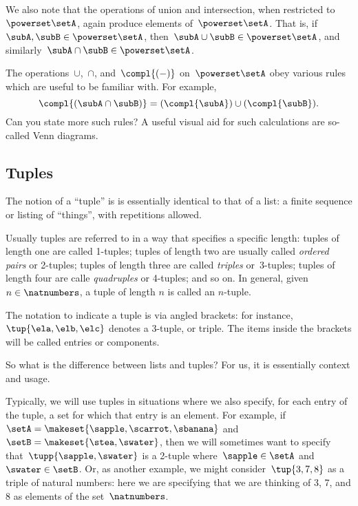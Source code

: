 We also note that the operations of union and intersection, when restricted to~$\powerset \setA$, again produce elements of~$\powerset \setA$.
That is, if~$\subA, \subB \in \powerset \setA$, then~$\subA \cup \subB \in \powerset \setA$, and similarly~$\subA \cap \subB \in \powerset \setA$.

The operations~$\cup$,~$\cap$, and~$\compl{( - )}$ on~$\powerset \setA$ obey various rules which are useful to be familiar with.
For example,
\begin{equation*}
    \compl{(\subA \cap \subB)} = (\compl{\subA}) \cup (\compl{\subB}).
\end{equation*}
Can you state more such rules?
A useful visual aid for such calculations are so-called Venn diagrams.


\subsection{Tuples}

The notion of a ``tuple'' is is essentially identical to that of a list: a finite sequence or listing of ``things'', with repetitions allowed.

Usually tuples are referred to in a way that specifies a specific length: tuples of length one are called 1-tuples; tuples of length two are usually called \emph{ordered pairs} or 2-tuples; tuples of length three are called \emph{triples} or~3-tuples; tuples of length four are calle \emph{quadruples} or 4-tuples; and so on.
In general, given~$n \in \natnumbers$, a tuple of length $n$ is called an $n$-tuple.

The notation to indicate a tuple is via angled brackets: for instance,~$\tup{\ela, \elb, \elc}$ denotes a 3-tuple, or triple.
The items inside the brackets will be called entries or components.

So what is the difference between lists and tuples?
For us, it is essentially context and usage.

Typically, we will use tuples in situations where we also specify, for each entry of the tuple, a set for which that entry is an element.
For example, if~$\setA = \makeset{ \sapple, \scarrot, \sbanana}$ and~$\setB = \makeset{ \stea, \swater }$, then we will sometimes want to specify that~$\tupp{\sapple, \swater}$ is a 2-tuple where~$\sapple \in \setA$ and~$\swater \in \setB$.
Or, as another example, we might consider~$\tup{3, 7, 8}$ as a triple of natural numbers: here we are specifying that we are thinking of 3, 7, and 8 as elements of the set~$\natnumbers$.

